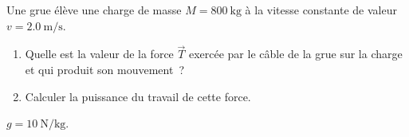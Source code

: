 Une grue élève une charge de masse $M=\qty{800}{\kg}$ à la vitesse constante de
valeur $v=\qty{2.0}{\m\per\s}$.
\begin{enumerate}
    \item Quelle est la valeur de la force $\vec{T}$ exercée par le câble de la
          grue sur la charge et qui produit son mouvement~?
    \item Calculer la puissance du travail de cette force.
\end{enumerate}
\begin{donnees}
    $g=\qty{10}{\N\per\kg}$.
\end{donnees}

